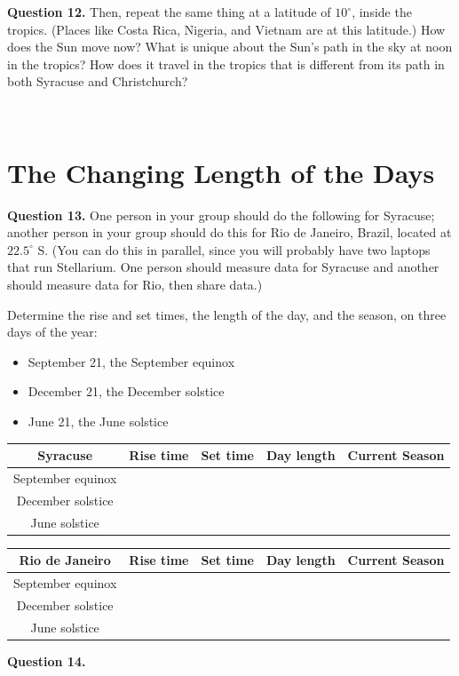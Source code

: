 \documentclass[11pt]{article}
\begin{document}
\textbf{Question 12.}
Then, repeat the same thing at a latitude of $10^\circ$, inside the tropics. (Places like Costa Rica, Nigeria, and Vietnam are at this latitude.)
How does the Sun move now? What is unique about the Sun's path in the sky at noon in the tropics? How does it travel in the tropics that is different from its path in both Syracuse and Christchurch?

\vspace*{2cm}
\hrulefill\\
\newpage
\section{The Changing Length of the Days}

\textbf{Question 13.}
One person in your group should do the following for Syracuse; another person in your group should do 
this for Rio de Janeiro, Brazil, located at $22.5^\circ$ S. (You can do this in parallel, since you will probably 
have two laptops that run Stellarium. One person should measure data for Syracuse and another should measure data for Rio, then share data.) 

Determine the rise and set times, the length of the day, and the season, on three days of the year:

\begin{itemize}
\item September 21, the September equinox
\item December 21, the December solstice 
\item June 21, the June solstice 
\end{itemize}

\begin{center}


\begin{tabular}{|c| c |c|c|c|}
\hline
\Large Syracuse \normalsize
 & Rise time & Set time & Day length & Current Season\\
\hline
September equinox & & & & \\
\hline
December solstice & & & & \\
\hline
June solstice & & & & \\
\hline
\end{tabular}
\normalsize
\end{center}

\bigskip

\begin{center}
\begin{tabular}{|c| c |c|c|c|}
\hline
\Large Rio de Janeiro \normalsize
 & Rise time & Set time & Day length & Current Season\\
\hline
September equinox & & & & \\
\hline
December solstice & & & & \\
\hline
June solstice & & & & \\
\hline
\end{tabular}
\normalsize
\end{center}
\textbf{Question 14.}
\end{document}
